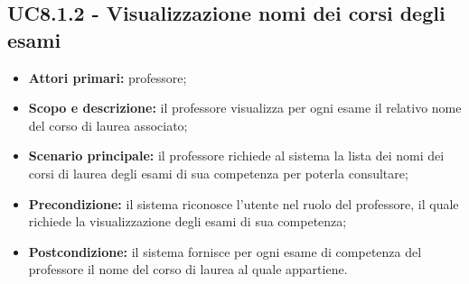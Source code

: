 \documentclass[AnalisiDeiRequisiti.tex]{subfiles}
\begin{document}
\subsection{UC8.1.2 - Visualizzazione nomi dei corsi degli esami}
\begin{itemize}
	\item \textbf{Attori primari:} professore;
	\item \textbf{Scopo e descrizione:} il professore visualizza per ogni esame il relativo nome del corso di laurea associato;
	\item \textbf{Scenario principale:} il professore richiede al sistema la lista dei nomi dei corsi di laurea degli esami di sua competenza per poterla consultare;
	\item \textbf{Precondizione:} il sistema riconosce l'utente nel ruolo del professore, il quale richiede la visualizzazione degli esami di sua competenza;
	\item \textbf{Postcondizione:} il sistema fornisce per ogni esame di competenza del professore il nome del corso di laurea al quale appartiene.
\end{itemize}
\end{document}
